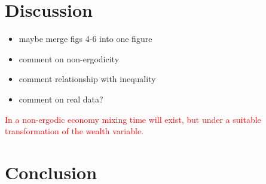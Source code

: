 \documentclass[11pt]{article}
\numberwithin{equation}{section}
\begin{document}
\section{Discussion}

\begin{itemize}
    \item maybe merge figs 4-6 into one figure
    \item comment on non-ergodicity
    \item comment relationship with inequality
    \item comment on real data?
\end{itemize}

\textcolor{red}{In a non-ergodic economy mixing time will exist, but under a suitable transformation of the wealth variable. }

\section{Conclusion}\label{sec:conclusion}

\end{document}
